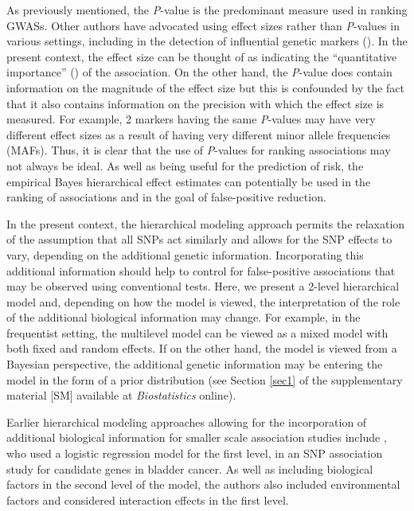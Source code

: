 As previously mentioned, the \textit{P}-value is the predominant
measure used in ranking GWASs. Other authors have advocated
using effect sizes rather than \textit{P}-values in various
settings, including in the detection of influential genetic
markers
(\citealp{rieger2004,tomlins2005,TTC01}).
In the present context, the effect size can
be thought of as indicating the ``quantitative importance''
(\citealp{Gichangi_Vach:2006})
of the association. On the other hand, the \textit{P}-value
does contain information on the magnitude of the effect
size but this is confounded by the fact that it also
contains information on the precision with which the effect
size is measured. For example, 2 markers having the same
\textit{P}-values may have very different effect sizes as a
result of having very different minor allele frequencies (MAFs).
Thus, it is clear that the use of \textit{P}-values for ranking
associations may not always be ideal. As well as being useful for
the prediction of risk, the empirical Bayes hierarchical effect
estimates can potentially be used in the ranking of associations
and in the goal of false-positive reduction.

In the present context, the hierarchical modeling approach
permits the relaxation of the assumption that all SNPs act
similarly and allows for the SNP effects to vary, depending on
the additional genetic information. Incorporating this additional
information should help to control for false-positive associations
that may be observed using conventional tests. Here, we present
a 2-level hierarchical model and, depending on how the model
is viewed, the interpretation of the role of the additional
biological information may change. For example, in the
frequentist setting, the multilevel model can be viewed as a
mixed model with both fixed and random effects. If on the other
hand, the model is viewed from a Bayesian perspective, the
additional genetic information may be entering the model in
the form of a prior distribution (see Section \ref{sec1} of
the supplementary material [SM] available at
\textit{Biostatistics} online).

Earlier hierarchical modeling approaches allowing for the
incorporation of additional biological information for smaller
scale association studies include
\citet{Barlow_Bartholomew:1972},
who used a logistic regression model for the first level,
in an SNP association study for candidate genes in bladder
cancer. As well as including biological factors in the second
level of the model, the authors also included environmental
factors and considered interaction effects in the first level.

